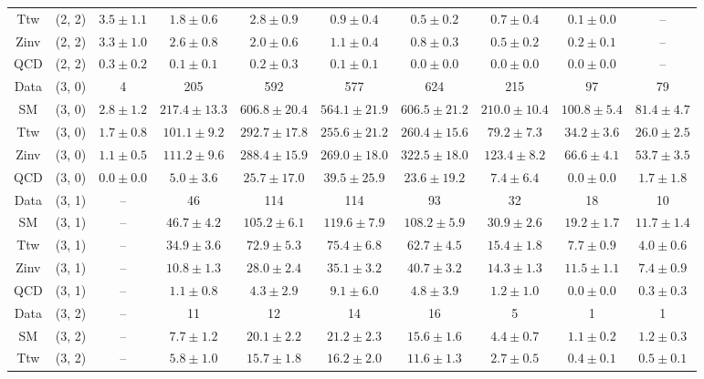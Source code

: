 \begin{table}[h!]
{\begin{tabular}{cccccccccc}
	Ttw & (2, 2) & $3.5\pm 1.1$ & $1.8\pm 0.6$ & $2.8\pm 0.9$ & $0.9\pm 0.4$ & $0.5\pm 0.2$ & $0.7\pm 0.4$ & $0.1\pm 0.0$ & -- \\[0.5ex] 
	Zinv & (2, 2) & $3.3\pm 1.0$ & $2.6\pm 0.8$ & $2.0\pm 0.6$ & $1.1\pm 0.4$ & $0.8\pm 0.3$ & $0.5\pm 0.2$ & $0.2\pm 0.1$ & -- \\[0.5ex] 
	QCD & (2, 2) & $0.3\pm 0.2$ & $0.1\pm 0.1$ & $0.2\pm 0.3$ & $0.1\pm 0.1$ & $0.0\pm 0.0$ & $0.0\pm 0.0$ & $0.0\pm 0.0$ & -- \\[0.5ex] 
	Data & (3, 0) & 4 & 205 & 592 & 577 & 624 & 215 & 97 & 79 \\[0.5ex] 
	SM & (3, 0) & $2.8\pm 1.2$ & $217.4\pm 13.3$ & $606.8\pm 20.4$ & $564.1\pm 21.9$ & $606.5\pm 21.2$ & $210.0\pm 10.4$ & $100.8\pm 5.4$ & $81.4\pm 4.7$ \\[0.5ex] 
	Ttw & (3, 0) & $1.7\pm 0.8$ & $101.1\pm 9.2$ & $292.7\pm 17.8$ & $255.6\pm 21.2$ & $260.4\pm 15.6$ & $79.2\pm 7.3$ & $34.2\pm 3.6$ & $26.0\pm 2.5$ \\[0.5ex] 
	Zinv & (3, 0) & $1.1\pm 0.5$ & $111.2\pm 9.6$ & $288.4\pm 15.9$ & $269.0\pm 18.0$ & $322.5\pm 18.0$ & $123.4\pm 8.2$ & $66.6\pm 4.1$ & $53.7\pm 3.5$ \\[0.5ex] 
	QCD & (3, 0) & $0.0\pm 0.0$ & $5.0\pm 3.6$ & $25.7\pm 17.0$ & $39.5\pm 25.9$ & $23.6\pm 19.2$ & $7.4\pm 6.4$ & $0.0\pm 0.0$ & $1.7\pm 1.8$ \\[0.5ex] 
	Data & (3, 1) & -- & 46 & 114 & 114 & 93 & 32 & 18 & 10 \\[0.5ex] 
	SM & (3, 1) & -- & $46.7\pm 4.2$ & $105.2\pm 6.1$ & $119.6\pm 7.9$ & $108.2\pm 5.9$ & $30.9\pm 2.6$ & $19.2\pm 1.7$ & $11.7\pm 1.4$ \\[0.5ex] 
	Ttw & (3, 1) & -- & $34.9\pm 3.6$ & $72.9\pm 5.3$ & $75.4\pm 6.8$ & $62.7\pm 4.5$ & $15.4\pm 1.8$ & $7.7\pm 0.9$ & $4.0\pm 0.6$ \\[0.5ex] 
	Zinv & (3, 1) & -- & $10.8\pm 1.3$ & $28.0\pm 2.4$ & $35.1\pm 3.2$ & $40.7\pm 3.2$ & $14.3\pm 1.3$ & $11.5\pm 1.1$ & $7.4\pm 0.9$ \\[0.5ex] 
	QCD & (3, 1) & -- & $1.1\pm 0.8$ & $4.3\pm 2.9$ & $9.1\pm 6.0$ & $4.8\pm 3.9$ & $1.2\pm 1.0$ & $0.0\pm 0.0$ & $0.3\pm 0.3$ \\[0.5ex] 
	Data & (3, 2) & -- & 11 & 12 & 14 & 16 & 5 & 1 & 1 \\[0.5ex] 
	SM & (3, 2) & -- & $7.7\pm 1.2$ & $20.1\pm 2.2$ & $21.2\pm 2.3$ & $15.6\pm 1.6$ & $4.4\pm 0.7$ & $1.1\pm 0.2$ & $1.2\pm 0.3$ \\[0.5ex] 
	Ttw & (3, 2) & -- & $5.8\pm 1.0$ & $15.7\pm 1.8$ & $16.2\pm 2.0$ & $11.6\pm 1.3$ & $2.7\pm 0.5$ & $0.4\pm 0.1$ & $0.5\pm 0.1$ \\[0.5ex] 

\end{tabular}}
\end{table}
